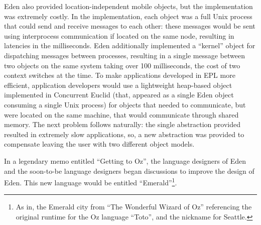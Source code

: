 Eden also provided location-independent mobile objects, but the implementation was extremely costly.  In the implementation, each object was a full Unix process that could send and receive messages to each other: these messages would be sent using interprocess communication if located on the same node, resulting in latencies in the milliseconds.  Eden additionally implemented a ``kernel'' object for dispatching messages between processes, resulting in a single message between two objects on the same system taking over 100 milliseconds, the cost of two context switches at the time.  To make applications developed in EPL more efficient, application developers would use a lightweight heap-based object implemented in Concurrent Euclid (that, appeared as a single Eden object consuming a single Unix process) for objects that needed to communicate, but were located on the same machine, that would communicate through shared memory.  The next problem follows naturally: the single abstraction provided resulted in extremely slow applications, so, a new abstraction was provided to compensate leaving the user with two different object models.

In a legendary memo entitled ``Getting to Oz'', the language designers of Eden and the soon-to-be language designers began discussions to improve the design of Eden.  This new language would be entitled ``Emerald''\footnote{As in, the Emerald city from ``The Wonderful Wizard of Oz'' referencing the original runtime for the Oz language ``Toto'', and the nickname for Seattle.}.

